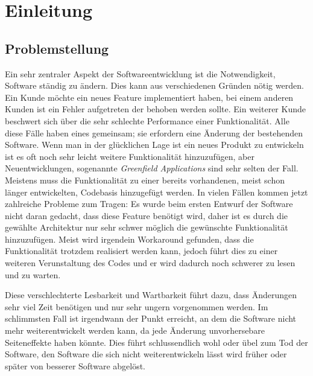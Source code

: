 \chapter{Einleitung}
\label{cha:Einleitung}

\section{Problemstellung}
Ein sehr zentraler Aspekt der Softwareentwicklung ist die Notwendigkeit, Software ständig zu ändern. Dies kann aus verschiedenen Gründen nötig werden. Ein Kunde möchte ein neues Feature implementiert haben, bei einem anderen Kunden ist ein Fehler aufgetreten der behoben werden sollte. Ein weiterer Kunde beschwert sich über die sehr schlechte Performance einer Funktionalität. Alle diese Fälle haben eines gemeinsam; sie erfordern eine Änderung der bestehenden Software. Wenn man in der glücklichen Lage ist ein neues Produkt zu entwickeln ist es oft noch sehr leicht weitere Funktionalität hinzuzufügen, aber Neuentwicklungen, sogenannte \textit{ Greenfield Applications} sind sehr selten der Fall. Meistens muss die Funktionalität zu einer bereits vorhandenen, meist schon länger entwickelten, Codebasis hinzugefügt werden. In vielen Fällen kommen jetzt zahlreiche Probleme zum Tragen: Es wurde beim ersten Entwurf der Software nicht daran gedacht, dass diese Feature benötigt wird, daher ist es durch die gewählte Architektur nur sehr schwer möglich die gewünschte Funktionalität hinzuzufügen. Meist wird irgendein Workaround gefunden, dass die Funktionalität trotzdem realisiert werden kann, jedoch führt dies zu einer weiteren Verunstaltung des Codes und er wird dadurch noch schwerer zu lesen und zu warten. 

Diese verschlechterte Lesbarkeit und Wartbarkeit führt dazu, dass Änderungen sehr viel Zeit benötigen und nur sehr ungern vorgenommen werden. Im schlimmsten Fall ist irgendwann der Punkt erreicht, an dem die Software nicht mehr weiterentwickelt werden kann, da jede Änderung unvorhersebare Seiteneffekte haben könnte. Dies führt schlussendlich wohl oder übel zum Tod der Software, den Software die sich nicht weiterentwickeln lässt wird früher oder später von besserer Software abgelöst. 

